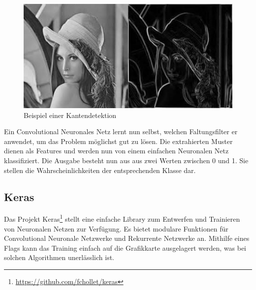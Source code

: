 \begin{figure}[H]
	\centering
	\includegraphics{images/kantendetektion.jpg}
	\caption{Beispiel einer Kantendetektion}
\end{figure}
Ein Convolutional Neuronales Netz lernt nun selbst, welchen Faltungsfilter er anwendet, um das Problem möglichst gut zu lösen. Die extrahierten Muster dienen als Features und werden nun von einem einfachen Neuronalen Netz klassifiziert. Die Ausgabe besteht nun aus aus zwei Werten zwischen 0 und 1. Sie stellen die Wahrscheinlichkeiten der entsprechenden Klasse dar.

\subsection{Keras}
Das Projekt Keras\footnote{\url{https://github.com/fchollet/keras}} stellt eine einfache Library zum Entwerfen und Trainieren von Neuronalen Netzen zur Verfügung. Es bietet modulare Funktionen für Convolutional Neuronale Netzwerke und Rekurrente Netzwerke an. Mithilfe eines Flags kann das Training einfach auf die Grafikkarte ausgelagert werden, was bei solchen Algorithmen unerlässlich ist.